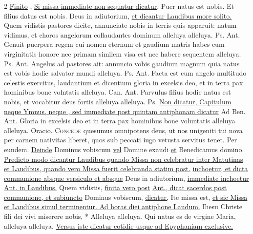 \begin{multicols*}{2}
 \ul{Finito} , \ul{Si missa immediate non sequatur dicatur,} \V Puer natus est nobis. \R Et filius datus est nobis. Deus in adiutorium, \ul{et dicantur Laudibus more solito.}
 Quem vidistis pastores dicite, annunciate nobis in terris quis apparuit: natum vidimus, et choros angelorum collaudantes dominum alleluya alleluya. {\color{Red} Ps.}  {\color{Red} Ant.} Genuit puerpera regem cui nomen eternum et gaudium matris habes cum virginitatis honore nec primam similem visa est nec habere sequentem alleluya. {\color{Red} Ps.}  {\color{Red} Ant.} Angelus ad pastores ait: annuncio vobis gaudium magnum quia natus est vobis hodie salvator mundi alleluya. {\color{Red} Ps.}  {\color{Red} Ant.} Facta est cum angelo multitudo celestis exercitus, laudantium et dicentium gloria in excelsis deo, et in terra pax hominibus bone volntatis alleluya. {\color{Red} Can.}  {\color{Red} Ant.} Parvulus filius hodie natus est nobis, et vocabitur deus fortis alleluya alleluya. {\color{Red} Ps.} 
\newline \ul{Non dicatur, Capitulum neque Ymnus, neque \Vbar , sed immediate post quintam antiphonam dicatur} {\color{Red} Ad Ben. Ant.} Gloria in excelsis deo et in terra pax hominibus bone voluntatis alleluya alleluya. {\color{Red} Oracio.}
\lettrine[lines=2]{\zallmancaps \color{Blue} C}{oncede} \hypertarget{concede-nativitas}{quesumus} omnipotens deus, ut nos unigeniti tui nova per carnem nativitas liberet, quos sub peccati iugo vetusta servitus tenet. Per eundem.
\newline \ul{Deinde} Dominus vobiscum \ul{vel} Domine exaudi \ul{et} Benedicamus domino. \ul{Predicto modo dicantur Laudibus quando Missa non celebratur inter Matutinas et Laudibus, quando vero Missa fuerit celebranda statim post.}  \ul{inchoetur, et dicta communione absque versiculo et absque} Deus in adiutorium, \ul{immediate inchoetur Ant. in Laudibus.} Quem vidistis, \ul{finita vero post}  \ul{Ant., dicat sacerdos post communione, et subiuncto} Dominus vobiscum, \ul{dicatur,} Ite missa est, \ul{et sic Missa et Laudibus simul terminentur. Ad horas diei antiphone Laudum.}
 \R Ihesu Christe fili dei vivi miserere nobis, * Alleluya alleluya. \V Qui natus es de virgine Maria, alleluya alleluya. \ul{Versus iste dicatur cotidie usque ad Epyphaniam exclusive.}

\end{multicols*}

